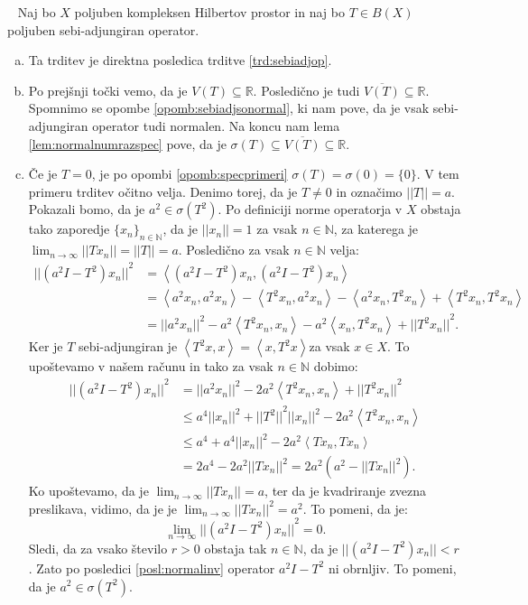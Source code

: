\documentclass[12pt,a4paper,oneside,fleqn,openany]{book}
\newcommand{\eopf}{\raisebox{0.8ex}{\framebox{}}} %
\newenvironment{dokaz}%
{\noindent{\bf Dokaz.}\ }%
{\hfill\eopf\par\bigskip}%
\newcommand{\R}{\mathbb{R}}
\newcommand{\N}{\mathbb{N}}
\newcommand{\abs}[1]{\ensuremath{\lvert #1 \rvert}}
\newcommand{\norm}[1]{\abs{\abs{#1}}}
\newcommand{\Sp}[2]{\ensuremath{\left<#1, #2\right>}}
\begin{document}
\begin{dokaz}
	Naj bo $X$ poljuben kompleksen Hilbertov prostor in naj bo $T\in B(X)$ poljuben sebi-adjungiran operator.
	\begin{enumerate}[a)]
		\item Ta trditev je direktna posledica trditve \ref{trd:sebiadjop}.
		\item Po prejšnji točki vemo, da je $V(T)\subseteq \R$. Posledično je tudi $\overline{V(T)}\subseteq\R$. Spomnimo se opombe \ref{opomb:sebiadjsonormal}, ki nam pove, da je vsak sebi-adjungiran operator tudi normalen. Na koncu nam lema \ref{lem:normalnumrazspec} pove, da je $\sigma(T)\subseteq\overline{V(T)}\subseteq \R$.
		\item Če je $T=0$, je po opombi \ref{opomb:specprimeri} $\sigma(T) = \sigma(0)=\{0\}$. V tem primeru trditev očitno velja. Denimo torej, da je $T\neq 0$ in označimo $\norm{T} = a$. Pokazali bomo, da je $a^2\in\sigma(T^2)$. Po definiciji norme operatorja v $X$ obstaja tako zaporedje $\{x_n\}_{n\in\N}$, da je $\norm{x_n}=1$ za vsak $n\in\N$, za katerega je $\lim_{n\to\infty}\norm{Tx_n} = \norm{T} = a$. Posledično za vsak $n\in\N$ velja: \begin{align*}
			\norm{(a^2I - T^2)x_n}^2 &= \Sp{(a^2I - T^2)x_n}{(a^2I - T^2)x_n} \\
			&= \Sp{a^2x_n}{a^2x_n} - \Sp{T^2x_n}{a^2x_n} - \Sp{a^2x_n}{T^2x_n} + \Sp{T^2x_n}{T^2x_n} \\
			&= \norm{a^2x_n}^2 - a^2\Sp{T^2x_n}{x_n} - a^2\Sp{x_n}{T^2x_n} + \norm{T^2x_n}^2.
		\end{align*}
		Ker je $T$ sebi-adjungiran je $\Sp{T^2x}{x} = \Sp{x}{T^2x}$za vsak $x\in X$. To upoštevamo v našem računu in tako za vsak $n\in\N$ dobimo: 
		\begin{align*}
			\norm{(a^2I - T^2)x_n}^2 &= \norm{a^2x_n}^2 - 2a^2\Sp{T^2x_n}{x_n} + \norm{T^2x_n}^2 \\
			&\leq a^4\norm{x_n}^2 + \norm{T^2}^2\norm{x_n}^2 - 2a^2\Sp{T^2x_n}{x_n}  \\
			&\leq a^4 + a^4\norm{x_n}^2 - 2a^2\Sp{Tx_n}{Tx_n}  \\
			&= 2a^4 - 2a^2\norm{Tx_n}^2 = 2a^2(a^2 - \norm{Tx_n}^2).
		\end{align*}
		Ko upoštevamo, da je $\lim_{n\to\infty}\norm{Tx_n} = a$, ter da je kvadriranje zvezna preslikava, vidimo, da je je $\lim_{n\to\infty}\norm{Tx_n}^2 = a^2$. To pomeni, da je: $$\lim_{n\to\infty}\norm{(a^2I - T^2)x_n}^2 = 0.$$ Sledi, da za vsako število $r>0$ obstaja tak $n\in \N$, da je $\norm{(a^2I-T^2)x_n} < r$. Zato po posledici \ref{posl:normalinv} operator $a^2I - T^2$ ni obrnljiv. To pomeni, da je $a^2 \in \sigma(T^2)$. 

\end{enumerate}
\end{dokaz}
\end{document}
